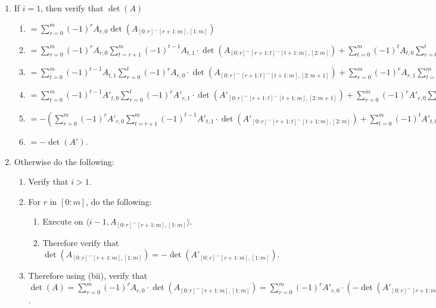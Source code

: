\documentclass[twocolumn]{article}
\newcommand{\procedurehr}[2][]{\hyperref[sec:procedure #2]{\ifthenelse{\equal{#1}{}}{procedure #2}{#1}}}
\begin{document}
				\begin{enumerate}
					\item If $i=1$, then verify that $\det(A)$
					\begin{enumerate}
						\item $=\sum_{r=0}^m (-1)^{r}A_{r,0}\det(A_{[0:r]^\frown[r+1:m],[1:m]})$
						\item $=\sum_{r=0}^m (-1)^{r}A_{r,0}\sum_{t=r+1}^m (-1)^{t-1}A_{t,1}\cdot\det(A_{[0:r]^\frown[r+1:t]^\frown[t+1:m],[2:m]})+\sum_{t=0}^m (-1)^{t}A_{t,0}\sum_{r=0}^{t} (-1)^{r}A_{r,1}\cdot\det(A_{[0:r]^\frown[r+1:t]^\frown[t+1:m],[2:m+1]})$
						\item $=\sum_{t=0}^m (-1)^{t-1}A_{t,1}\sum_{r=0}^{t} (-1)^{r}A_{r,0}\cdot\det(A_{[0:r]^\frown[r+1:t]^\frown[t+1:m],[2:m+1]})+\sum_{r=0}^m (-1)^{r}A_{r,1}\sum_{t=r+1}^m (-1)^{t}A_{t,0}\cdot\det(A_{[0:r]^\frown[r+1:t]^\frown[t+1:m],[2:m+1]})$
						\item $=\sum_{t=0}^m (-1)^{t-1}A'_{t,0}\sum_{r=0}^{t} (-1)^{r}A'_{r,1}\cdot\det(A'_{[0:r]^\frown[r+1:t]^\frown[t+1:m],[2:m+1]})+\sum_{r=0}^m (-1)^{r}A'_{r,0}\sum_{t=r+1}^m (-1)^{t}A'_{t,1}\cdot\det(A'_{[0:r]^\frown[r+1:t]^\frown[t+1:m],[2:m]})$
						\item $=-(\sum_{r=0}^m (-1)^{r}A'_{r,0}\sum_{t=r+1}^m (-1)^{t-1}A'_{t,1}\cdot\det(A'_{[0:r]^\frown[r+1:t]^\frown[t+1:m],[2:m]})+\sum_{t=0}^m (-1)^{t}A'_{t,0}\sum_{r=0}^{t} (-1)^{r}A'_{r,1}\cdot\det(A'_{[0:r]^\frown[r+1:t]^\frown[t+1:m],[2:m]}))$
						\item $=-\det(A')$.
					\end{enumerate}
					\item Otherwise do the following:
					\begin{enumerate}
						\item Verify that $i>1$.
						\item For $r$ in $[0:m]$, do the following:
						\begin{enumerate}
							\item Execute \procedurehr{3.16} on $\langle i-1,A_{[0:r]^\frown[r+1:m],[1:m]}\rangle$.
							\item Therefore verify that $\det(A_{[0:r]^\frown[r+1:m],[1:m]})=-\det(A'_{[0:r]^\frown[r+1:m],[1:m]})$.
						\end{enumerate}
						\item Therefore using (bii), verify that $\det(A)=\sum_{r=0}^m (-1)^{r}A_{r,0}\cdot\det(A_{[0:r]^\frown[r+1:m],[1:m]})=\sum_{r=0}^m (-1)^{r}A'_{r,0}\cdot(-\det(A'_{[0:r]^\frown[r+1:m],[1:m]}))=-\det(A')$.
					\end{enumerate}
				\end{enumerate}
\end{document}

